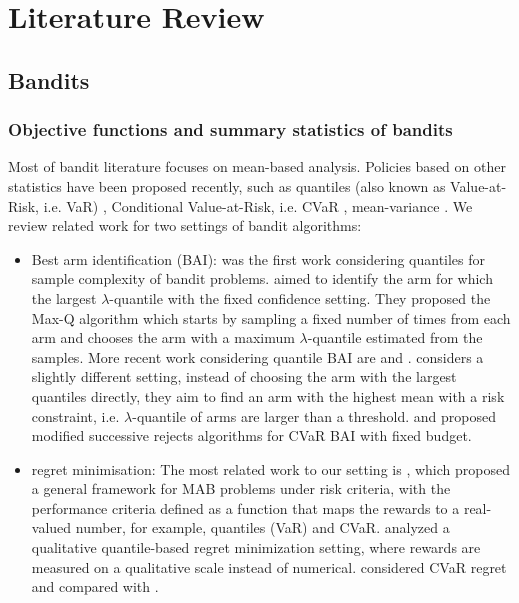 \chapter{Literature Review} \label{ch-2}

\section{Bandits}

\subsection{Objective functions and summary statistics of bandits}

Most of bandit literature focuses on mean-based analysis. Policies based on other statistics have been proposed recently, such as quantiles (also known as Value-at-Risk, i.e. VaR) \cite{david_pure_2016, david_pac_nodate, cassel_general_2018}, Conditional Value-at-Risk, i.e. CVaR \cite{cassel_general_2018}, mean-variance \cite{sani_risk-aversion_2012}. We review related work for two settings of bandit algorithms:

\begin{itemize}
    \item Best arm identification (BAI): \textcite{yu2013sample} was the first work considering quantiles for sample complexity of bandit problems.   \textcite{david_pure_2016} aimed to identify the arm for which the largest $\lambda$-quantile with the fixed confidence setting. They proposed the Max-Q algorithm which starts by sampling a fixed number of times from each arm and chooses the arm with a maximum $\lambda$-quantile estimated from the samples. More recent work considering quantile BAI are \textcite{howard_sequential_2019} and \textcite{torossian_x-armed_2019}. \cite{david_pac_nodate} considers a slightly different setting, instead of choosing the arm with the largest quantiles directly, they aim to find an arm with the highest mean with a risk constraint, i.e. $\lambda$-quantile of arms are larger than a threshold. \textcite{kagrecha_distribution_2019} and \textcite{la2019concentration} proposed modified successive rejects algorithms for CVaR BAI with fixed budget. 
    
    \item regret minimisation: The most related work to our setting is \textcite{cassel_general_2018}, which proposed a general framework for MAB problems under risk criteria, with the performance criteria defined as a function that maps the rewards to a real-valued number, for example, quantiles (VaR) and CVaR. \textcite{szorenyi2015qualitative} analyzed a qualitative quantile-based regret minimization setting, where rewards are measured on a qualitative scale instead of numerical. \textcite{tamkind2019} considered CVaR regret and compared with \textcite{cassel_general_2018}. 
\end{itemize}

